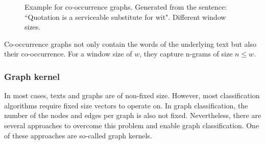 \begin{figure}[ht]%
    \centering
    \caption{Example for co-occurrence graphs. Generated from the sentence: ``Quotation is a serviceable substitute for wit". Different window sizes.}%
    \label{fig:cooccurrence_graphs}%
\end{figure}

Co-occurrence graphs not only contain the words of the underlying text but also their co-occurrence.
For a window size of $w$, they capture n-grams of size $n \leq w$.

\subsubsection{Graph kernel}
In most cases, texts and graphs are of non-fixed size. 
However, most classification algorithms require fixed size vectors to operate on.
In graph classification, the number of the nodes and edges per graph is also not fixed.
Nevertheless, there are several approaches to overcome this problem and enable graph classification.
One of these approaches are so-called graph kernels.

